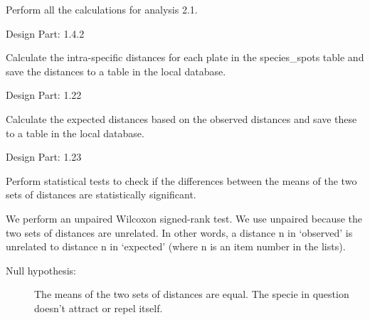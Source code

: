 \documentclass[letterpaper,10pt,english]{sphinxmanual}
\begin{document}
\begin{fulllineitems}
\label{setlyze/analysis/attraction_intra:setlyze.analysis.attraction_intra.Start}
Perform all the calculations for analysis 2.1.

Design Part: 1.4.2

\begin{fulllineitems}
\label{setlyze/analysis/attraction_intra:setlyze.analysis.attraction_intra.Start.calculate_distances_intra}
Calculate the intra-specific distances for each plate in the
species\_spots table and save the distances to a table in
the local database.

Design Part: 1.22

\end{fulllineitems}


\begin{fulllineitems}
\label{setlyze/analysis/attraction_intra:setlyze.analysis.attraction_intra.Start.calculate_distances_intra_expected}
Calculate the expected distances based on the observed
distances and save these to a table in the local database.

Design Part: 1.23

\end{fulllineitems}


\begin{fulllineitems}
\label{setlyze/analysis/attraction_intra:setlyze.analysis.attraction_intra.Start.calculate_significance}
Perform statistical tests to check if the differences between
the means of the two sets of distances are statistically
significant.

We perform an unpaired Wilcoxon signed-rank test. We use unpaired
because the two sets of distances are unrelated. In other words,
a distance n in `observed' is unrelated to distance n in
`expected' (where n is an item number in the lists).
\begin{description}
\item[{Null hypothesis:}] \leavevmode
The means of the two sets of distances are
equal. The specie in question doesn't attract or repel itself.


\end{description}
\end{fulllineitems}
\end{fulllineitems}
\end{document}

